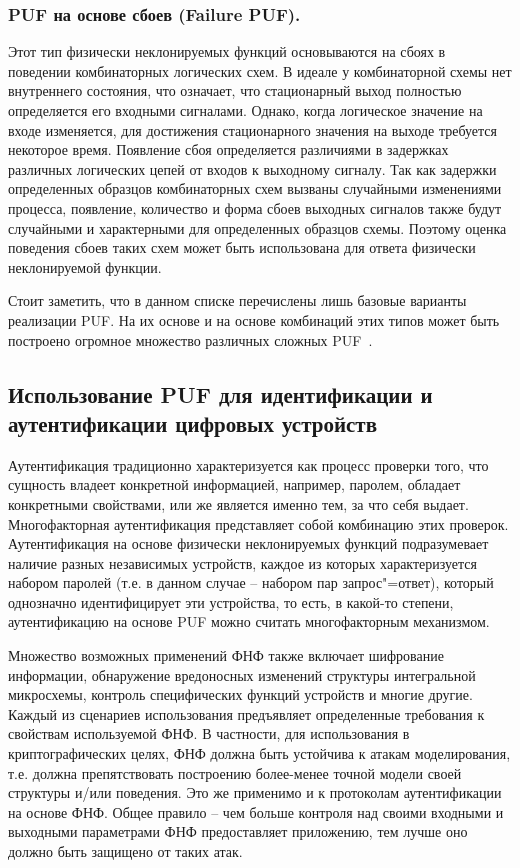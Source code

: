 \subsubsection{PUF на основе сбоев (Failure PUF). }
\label{sub:domain:puf_types:failure_puf}

Этот тип физически неклонируемых функций основываются на сбоях в поведении комбинаторных логических схем. В идеале у комбинаторной схемы нет внутреннего состояния, что означает, что стационарный выход полностью определяется его входными сигналами. Однако, когда логическое значение на входе изменяется, для достижения стационарного значения на выходе требуется некоторое время. Появление сбоя определяется различиями в задержках различных логических цепей от входов к выходному сигналу. Так как задержки определенных образцов комбинаторных схем вызваны случайными изменениями процесса, появление, количество и форма сбоев выходных сигналов также будут случайными и характерными для определенных образцов схемы. Поэтому оценка поведения сбоев таких схем может быть использована для ответа физически неклонируемой функции.

Стоит заметить, что в данном списке перечислены лишь базовые варианты реализации PUF. На их основе и на основе комбинаций этих типов может быть построено огромное множество различных сложных PUF~\cite{cryptowiki_pufs, rmaes_pufs}.


\subsection{Использование PUF для идентификации и аутентификации цифровых устройств}
\label{sub:domain:puf_auth}
Аутентификация традиционно характеризуется как процесс проверки того, что сущность владеет конкретной информацией, например, паролем, обладает конкретными свойствами, или же является именно тем, за что себя выдает. Многофакторная аутентификация представляет собой комбинацию этих проверок. Аутентификация на основе физически неклонируемых функций подразумевает наличие разных независимых устройств, каждое из которых характеризуется набором паролей (т.е. в данном случае -- набором пар запрос"=ответ), который однозначно идентифицирует эти устройства, то есть, в какой-то степени, аутентификацию на основе PUF можно считать многофакторным механизмом.

Множество возможных применений ФНФ также включает шифрование информации, обнаружение вредоносных изменений структуры интегральной микросхемы, контроль специфических функций устройств и многие другие. Каждый из сценариев использования предъявляет определенные требования к свойствам используемой ФНФ. В частности, для использования в криптографических целях, ФНФ должна быть устойчива к атакам моделирования, т.е. должна препятствовать построению более-менее точной модели своей структуры и/или поведения. Это же применимо и к протоколам аутентификации на основе ФНФ. Общее правило -- чем больше контроля над своими входными и выходными параметрами ФНФ предоставляет приложению, тем лучше оно должно быть защищено от таких атак.

